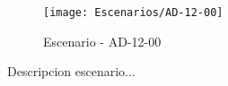 \begin{figure}[H]
\centering
\texttt{[image: Escenarios/AD-12-00]}
\caption{Escenario - AD-12-00}
\label{fig:AD-12-00}
\end{figure}

Descripcion escenario...
\clearpage
